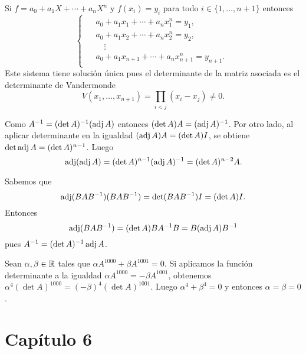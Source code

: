 

\begin{solution}
	Si $f=a_0+a_1X+\cdots+a_nX^n$ y $f(x_i)=y_i$ para todo
	$i\in\{1,\dots,n+1\}$ entonces 
	\[
	\begin{cases}
		\begin{aligned}
			& a_0+a_1x_1+\cdots+a_nx_1^n = y_1,\\
			& a_0+a_1x_2+\cdots+a_nx_2^n = y_2,\\
			&\quad\vdots\\
			& a_0+a_1x_{n+1}+\cdots+a_nx_{n+1}^{n} = y_{n+1}.
		\end{aligned}
	\end{cases}
	\]
	Este sistema tiene solución única pues el determinante de la matriz
	asociada es el determinante de Vandermonde \[
		V(x_1,\dots,x_{n+1})=\prod_{i<j}(x_i-x_j)\ne0.
	\]
\end{solution}

\begin{solution}
	Como $A^{-1}=(\det A)^{-1}(\operatorname{adj} A)$ entonces $(\det A)A=(\operatorname{adj} A)^{-1}$. Por
	otro lado, al aplicar determinante en la igualdad $(\operatorname{adj} A)A=(\det A)I$, se
	obtiene $\det\operatorname{adj} A=(\det A)^{n-1}$. Luego
	\[
	\operatorname{adj}(\operatorname{adj} A)=(\det A)^{n-1}(\operatorname{adj} A)^{-1}=(\det A)^{n-2}A.
	\]
\end{solution}

\begin{solution}
		Sabemos que \[
			\operatorname{adj}(BAB^{-1})(BAB^{-1})=\det(BAB^{-1})I=(\det A)I.
		\]
		Entonces
		\[
			\operatorname{adj}(BAB^{-1})=(\det A)BA^{-1}B=B(\operatorname{adj} A)B^{-1}
		\]
		pues $A^{-1}=(\det A)^{-1}\operatorname{adj} A$. 
\end{solution}

\begin{solution}
    Sean $\alpha,\beta\in\mathbb{R}$ tales que $\alpha A^{1000}+\beta A^{1001}=0$. Si
    aplicamos la función determinante a la igualdad $\alpha A^{1000}=-\beta
    A^{1001}$, obtenemos $\alpha^4(\det A)^{1000}=(-\beta)^4(\det A)^{1001}$. Luego $\alpha^4+\beta^4=0$ y entonces
    $\alpha=\beta=0$.

\end{solution}
\section{Capítulo 6}


